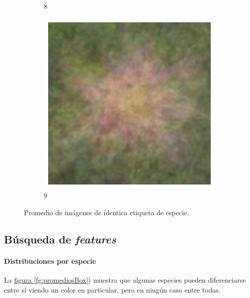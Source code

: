\documentclass{article}
\begin{document}
\begin{figure}
\begin{subfigure}[b]{0.09\textwidth}
		\caption{8}
	\end{subfigure}
	\begin{subfigure}[b]{0.09\textwidth}
		\includegraphics[width= \textwidth]{ave9}
		\caption{9}
	\end{subfigure}
	\caption{Promedio de imágenes de ídentica etiqueta de especie.}
	\label{fg:promedios}
\end{figure}



\subsection{Búsqueda de \emph{features}}

\paragraph{Distribuciones por especie} La \hyperref[fg:promediosBox]{figura \ref*{fg:promediosBox}}) muestra que algunas especies pueden diferenciarse entre sí viendo un color en particular, pero en ningún caso entre todas.
\end{document}
